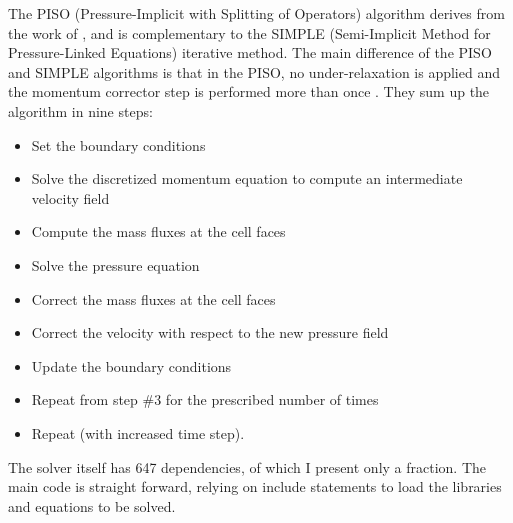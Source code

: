 The PISO (Pressure-Implicit with Splitting of Operators) algorithm derives from the work of , and is complementary to the SIMPLE (Semi-Implicit Method for Pressure-Linked Equations)  iterative method.
The main difference of the PISO and SIMPLE algorithms is that in the PISO, no under-relaxation is applied and the momentum corrector step is performed more than once .
They sum up the algorithm in nine steps:
\begin{itemize}
\item Set the boundary conditions
\item Solve the discretized momentum equation to compute an intermediate velocity field
\item Compute the mass fluxes at the cell faces
\item Solve the pressure equation
\item Correct the mass fluxes at the cell faces
\item Correct the velocity with respect to the new pressure field
\item Update the boundary conditions
\item Repeat from step \#3 for the prescribed number of times
\item Repeat (with increased time step).
\end{itemize}

The solver itself has 647 dependencies, of which I present only a fraction.
The main code is straight forward, relying on include statements to load the libraries and equations to be solved.

